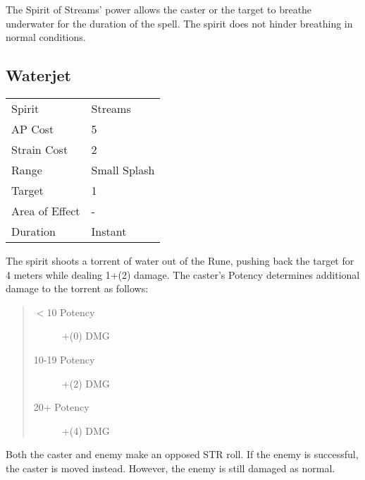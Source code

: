 \documentclass[11pt,a4paper,twocolumn]{book}
\begin{document}
The Spirit of Streams' power allows the caster or the target to breathe underwater for the duration of the spell. The spirit does not hinder breathing in normal conditions.

\subsection*{Waterjet}
{
	\begin{tabu} to 70mm{| X[l,4] | X[l,7] |}
		\hline
		Spirit         & Streams      \\
		AP Cost        & 5            \\
		Strain Cost    & 2            \\
		Range          & Small Splash \\
		Target         & 1            \\
		Area of Effect & -            \\
		Duration       & Instant      \\ \hline
	\end{tabu}
	
}
\medskip

The spirit shoots a torrent of water out of the Rune, pushing back the target for 4 meters while dealing 1+(2) damage. The caster's Potency determines additional damage to the torrent as follows:

\begin{quote}
	\begin{description}
		\item[$<$10 Potency] 	+(0) DMG
		\item[10-19 Potency] 	+(2) DMG
		\item[20+ Potency] 		+(4) DMG
	\end{description}	
\end{quote}

Both the caster and enemy make an opposed STR roll. If the enemy is successful, the caster is moved instead. However, the enemy is still damaged as normal.
\end{document}
